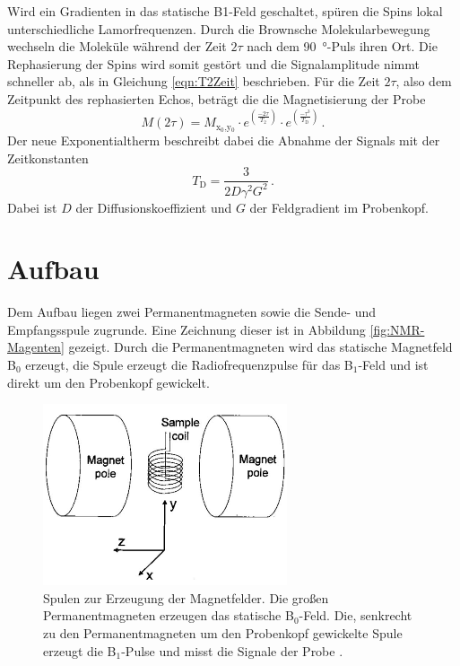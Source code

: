 Wird ein Gradienten in das statische B1-Feld geschaltet, spüren die Spins lokal unterschiedliche Lamorfrequenzen.
Durch die Brownsche Molekularbewegung wechseln die Moleküle während der Zeit $2\tau$ nach dem \SI{90}{\degree}-Puls ihren Ort.
Die Rephasierung der Spins wird somit gestört und die Signalamplitude nimmt schneller ab, als in Gleichung \eqref{eqn:T2Zeit} beschrieben.
Für die Zeit $2\tau$, also dem Zeitpunkt des rephasierten Echos, beträgt die die Magnetisierung der Probe
\begin{equation}
  M(2\tau) = M_\text{x$_0$,y$_0$} \cdot e^{(\frac{-2\tau}{T_2})} \cdot e^{(\frac{-\tau^3}{T_\text{D}})} \, .
  \label{eqn:Diffusion}
\end{equation}
Der neue Exponentialtherm beschreibt dabei die Abnahme der Signals mit der Zeitkonstanten
\begin{equation}
  T_\text{D} = \frac{3}{2D \gamma^2 G^2}\,.
  \label{eqn:TDiffusion}
\end{equation}
Dabei ist $D$ der Diffusionskoeffizient und $G$ der Feldgradient im Probenkopf.


\section{Aufbau}
Dem Aufbau liegen zwei Permanentmagneten sowie die Sende- und Empfangsspule zugrunde.
Eine Zeichnung dieser ist in Abbildung \ref{fig:NMR-Magenten} gezeigt.
Durch die Permanentmagneten wird das statische Magnetfeld B$_0$ erzeugt, die Spule erzeugt die Radiofrequenzpulse für das B$_1$-Feld und ist direkt um den Probenkopf gewickelt.

\begin{figure}[H]
  \centering
  \includegraphics[width = .4\textwidth]{NMR-Magnete.png}
  \caption{Spulen zur Erzeugung der Magnetfelder. Die großen Permanentmagneten erzeugen das statische B$_0$-Feld. Die, senkrecht zu den Permanentmagneten um den Probenkopf gewickelte Spule erzeugt die B$_1$-Pulse und misst die Signale der Probe \cite{Aachen}. }
  \label{fig:NMR-Magneten}
\end{figure}

